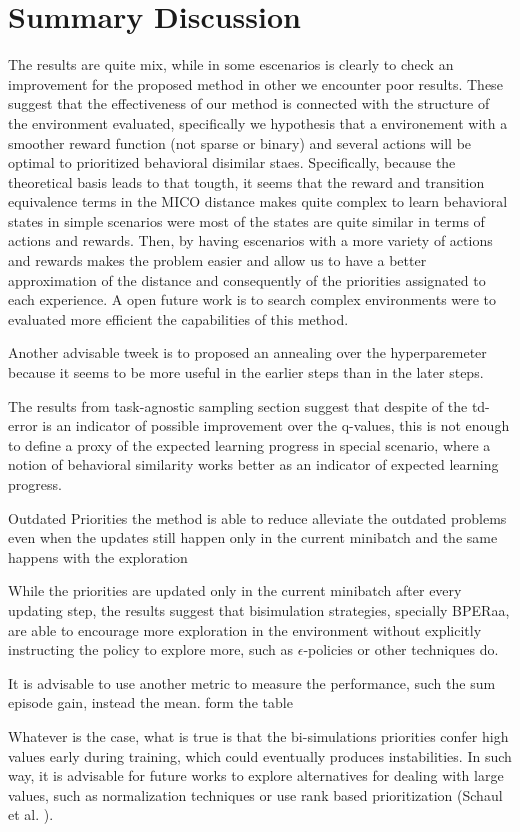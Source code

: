 \section{Summary Discussion}

The results are quite mix, while in some escenarios is clearly to check an improvement for the proposed method in other we encounter poor results. These suggest that the effectiveness of our method is connected with the structure of the environment evaluated, specifically we hypothesis that a environement with a smoother reward function (not sparse or binary) and several actions will be optimal to prioritized behavioral disimilar staes. Specifically, because the theoretical basis leads to that tougth, it seems that the reward and transition equivalence terms in the MICO distance makes quite complex to learn behavioral states in simple scenarios were most of the states are quite similar in terms of actions and rewards. Then, by having escenarios with a more variety of actions and rewards makes the problem easier and allow us to have a better approximation of the distance and consequently of the priorities assignated to each experience. A open future work is to search complex environments were to evaluated more efficient the capabilities of this method. 

Another advisable tweek is to proposed an annealing over the hyperparemeter because it seems to be more useful in the earlier steps than in the later steps.

The results from task-agnostic sampling section suggest that despite of the td-error is an indicator of possible improvement over the q-values, this is not enough to define a proxy of the expected learning progress in special scenario, where a notion of behavioral similarity works better as an indicator of expected learning progress.

Outdated Priorities the method is able to reduce alleviate the outdated problems even when the updates still happen only in the current minibatch and the same happens with the exploration


While the priorities are updated only in the current minibatch after every updating step, the results suggest that bisimulation strategies, specially BPERaa, are able to encourage more exploration in the environment without explicitly instructing the policy to explore more, such as $\epsilon$-policies or other techniques do.


It is advisable to use another metric to measure the performance, such the sum episode gain, instead the mean. form the table

Whatever is the case, what is true is that the bi-simulations priorities confer high values early during training, which could eventually produces instabilities. In such way, it is advisable for future works to explore alternatives for dealing with large values, such as normalization techniques or use rank based prioritization (Schaul et al. \cite{schaul2015prioritized}).
